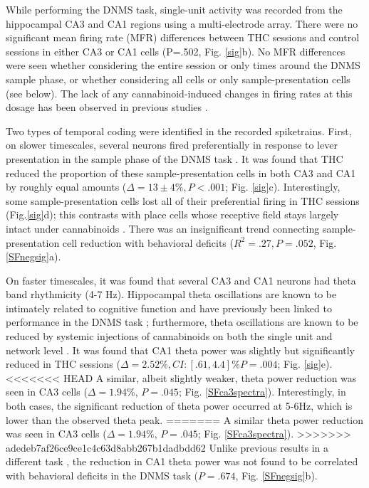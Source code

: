 \documentclass[11pt,a4paper,final]{article}
\begin{document}
While performing the DNMS task, single-unit activity was recorded from the hippocampal CA3 and CA1 regions using a multi-electrode array.
There were no significant mean firing rate (MFR) differences between THC sessions and control sessions in either CA3 or CA1 cells (P=.502, Fig. \ref{sig}b).
No MFR differences were seen whether considering the entire session or only times around the DNMS sample phase, or whether considering all cells or only sample-presentation cells (see below).
The lack of any cannabinoid-induced changes in firing rates at this dosage has been observed in previous studies \citep{robbe06,goon10}.

Two types of temporal coding were identified in the recorded spiketrains.
First, on slower timescales, several neurons fired preferentially in response to lever presentation in the sample phase of the DNMS task \citep{hampson99}.
It was found that THC reduced the proportion of these sample-presentation cells in both CA3 and CA1 by roughly equal amounts ($\Delta=13\pm4\%, P<.001$; Fig. \ref{sig}c).
Interestingly, some sample-presentation cells lost all of their preferential firing in THC sessions (Fig.\ref{sig}d); this contrasts with place cells whose receptive field stays largely intact under cannabinoids \citep{robbe09}.
There was an insignificant trend connecting sample-presentation cell reduction with behavioral deficits ($R^2=.27, P=.052$, Fig. \ref{SFnegsig}a).

On faster timescales, it was found that several CA3 and CA1 neurons had theta band rhythmicity (4-7 Hz).
Hippocampal theta oscillations are known to be intimately related to cognitive function \citep{buzsaki06,colgin13,moser13} and have previously been linked to performance in the DNMS task \citep{hasselmo10};
furthermore, theta oscillations are known to be reduced by systemic injections of cannabinoids on both the single unit \citep{robbe06} and network level \citep{kocsis08}.
It was found that CA1 theta power was slightly but significantly reduced in THC sessions ($\Delta=2.52\%, CI:[.61,4.4]\% P=.004$; Fig. \ref{sig}e).
<<<<<<< HEAD
A similar, albeit slightly weaker, theta power reduction was seen in CA3 cells ($\Delta=1.94\%$, $P=.045$; Fig. \ref{SFca3spectra}).
Interestingly, in both cases, the significant reduction of theta power occurred at 5-6Hz, which is lower than the observed theta peak.   
=======
A similar theta power reduction was seen in CA3 cells ($\Delta=1.94\%$, $P=.045$; Fig. \ref{SFca3spectra}).
>>>>>>> adedeb7af26ce9ce1c4c63d8abb267b1dadbdd62
Unlike previous results in a different task \citep{robbe06}, the reduction in CA1 theta power was not found to be correlated with behavioral deficits in the DNMS task ($P=.674$, Fig. \ref{SFnegsig}b).
\end{document}
